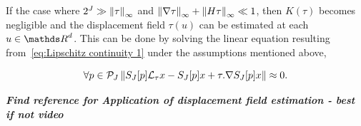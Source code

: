 \documentclass[a4paper,11pt]{report}
\begin{document}
{			\begin{rem}
				If the case where $2^{J} \gg \left\lVert \tau \right\rVert_{\infty}$ and $\left\lVert \nabla \tau \right\rVert_{\infty} + \left\lVert H \tau \right\rVert_{\infty} \ll 1$, then $K(\tau)$ becomes negligible and the displacement field $\tau(u)$ can be estimated at each $u \in \dsR^{d}$. This can be done by solving the linear equation resulting from~\ref{eq:Lipschitz continuity 1} under the assumptions mentioned above,
				
				\begin{equation}
					\forall p \in \mathcal{P}_{J} \left\lVert S_{J}[p]\mathcal{L}_{\tau}x - S_{J}[p]x + \tau . \nabla S_{J}[p]x \right\rVert \approx 0.
					\label{eq:Lipschitz continuity 2}  
				\end{equation}

				\textbf{\textit{Find reference for Application of displacement field estimation - best if not video}}
			\end{rem}
			
% 
%       
%       

      
      
% 		
 
}
\end{document}
